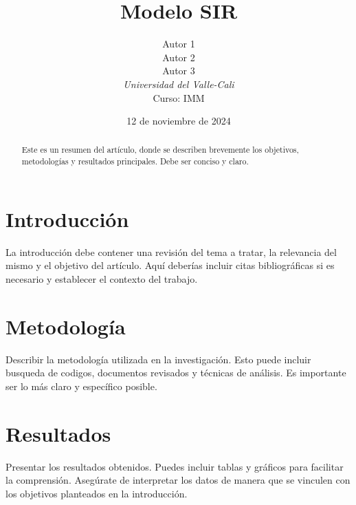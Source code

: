 \documentclass[twocolumn]{article}
\title{Modelo SIR}
\author{Autor 1 \\ Autor 2 \\ Autor 3 \\ \textit{Universidad del Valle-Cali}\\ Curso: IMM}
\date{12 de noviembre de 2024}
\begin{document}
  

\maketitle  

\begin{abstract}  
  Este es un resumen del artículo, donde se describen brevemente los objetivos, metodologías y resultados principales. Debe ser conciso y claro.  
\end{abstract}  

\section{Introducción}  
La introducción debe contener una revisión del tema a tratar, la relevancia del mismo y el objetivo del artículo. Aquí deberías incluir citas bibliográficas si es necesario y establecer el contexto del trabajo.
\cite{smith2004sir}

\section{Metodología}  
Describir la metodología utilizada en la investigación. Esto puede incluir busqueda de codigos, documentos revisados y técnicas de análisis. Es importante ser lo más claro y específico posible.  

\section{Resultados}  
Presentar los resultados obtenidos. Puedes incluir tablas y gráficos para facilitar la comprensión. Asegúrate de interpretar los datos de manera que se vinculen con los objetivos planteados en la introducción.  
\end{document}
